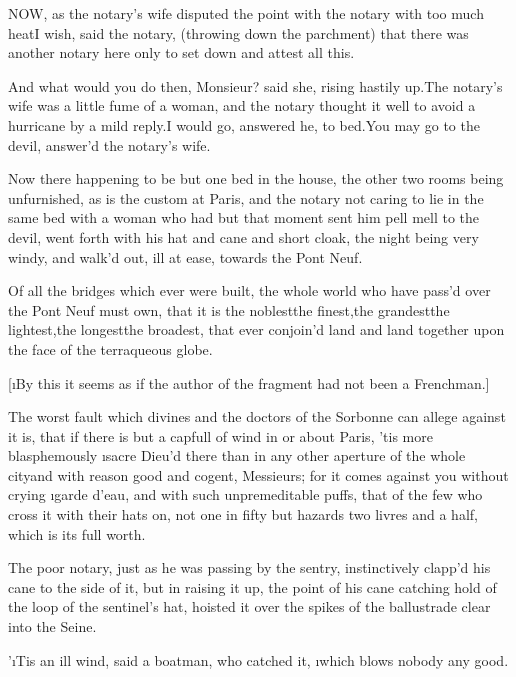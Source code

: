 \documentclass[twoside]{article}
\begin{document}

\vskip 6pt


\tskk NOW, as the notary’s wife disputed
the point with the notary with too much
heat\tskk I wish, said the notary,
(throwing down the parchment) that there
was another notary here only to set down
and attest all this.\tskk 

\tskk And what would you do then,
Monsieur? said she, rising hastily
up.\tskk The notary’s wife was a little
fume of a woman, and the notary thought it
well to avoid a hurricane by a mild
reply.\tskk I would go, answered he, to
bed.\tskk You may go to the devil,
answer’d the notary’s wife.

Now there happening to be but one bed in
the house, the other two rooms being
unfurnished, as is the custom at Paris,
and the notary not caring to lie in the
same bed with a woman who had but that
moment sent him pell mell to the devil,
went forth with his hat and cane and short
cloak, the night being very windy, and
walk’d out, ill at ease, towards the Pont
Neuf.

Of all the bridges which ever were built,
the whole world who have pass’d over the
Pont Neuf must own, that it is the
noblest\tskk the finest,\tskk the
grandest\tskk the lightest,\tskk the
longest\tskk the broadest, that ever
conjoin’d land and land together upon the
face of the terraqueous globe.

[\i{By this it seems as if the author of
the fragment had not been a Frenchman}.]

The worst fault which divines and the
doctors of the Sorbonne can allege against
it is, that if there is but a capfull of
wind in or about Paris, ’tis more
blasphemously \i{sacre Dieu’d} there than
in any other aperture of the whole
city\tskk and with reason good and
cogent, Messieurs; for it comes against
you without crying \i{garde d’eau}, and
with such unpremeditable puffs, that of
the few who cross it with their hats on,
not one in fifty but hazards two livres
and a half, which is its full worth.

The poor notary, just as he was passing by
the sentry, instinctively clapp’d his cane
to the side of it, but in raising it up,
the point of his cane catching hold of the
loop of the sentinel’s hat, hoisted it
over the spikes of the ballustrade clear
into the Seine.\tskk 

\tskk ’\i{Tis an ill wind}, said a
boatman, who catched it, \i{which blows
nobody any good}.
\end{document}

